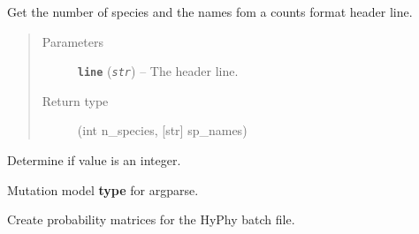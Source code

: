 \documentclass[letterpaper,10pt,english]{sphinxmanual}
\begin{document}
\begin{fulllineitems}
\label{main:libPoMo.main.get_species_from_cf_headerline}
Get the number of species and the names fom a counts format header line.
\begin{quote}\begin{description}
\item[{Parameters}] \leavevmode
\textbf{\texttt{line}} (\emph{\texttt{str}}) -- The header line.

\item[{Return type}] \leavevmode
(int n\_species, {[}str{]} sp\_names)

\end{description}\end{quote}

\end{fulllineitems}


\begin{fulllineitems}
\label{main:libPoMo.main.is_number}
Determine if value is an integer.

\end{fulllineitems}


\begin{fulllineitems}
\label{main:libPoMo.main.mutModel}
Mutation model \textbf{type} for argparse.

\end{fulllineitems}


\begin{fulllineitems}
\label{main:libPoMo.main.probability_matrix}
Create probability matrices for the HyPhy batch file.

\end{fulllineitems}

\end{document}
